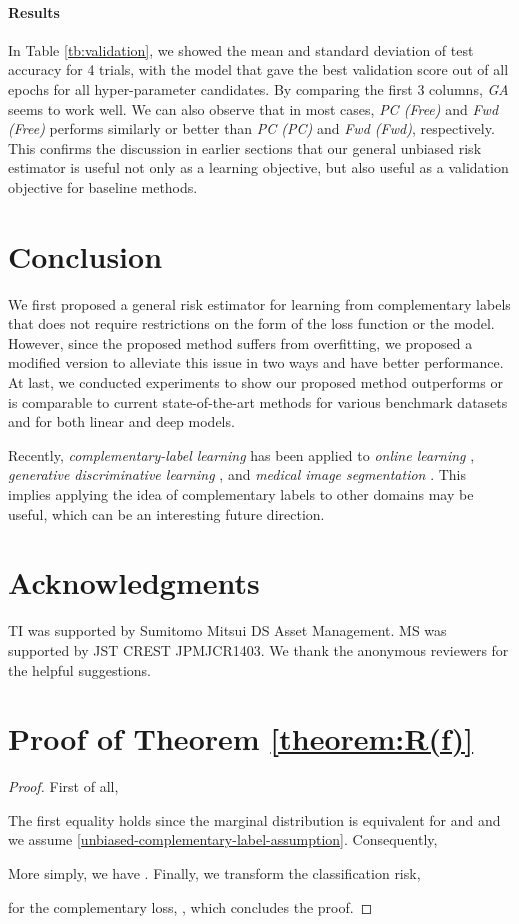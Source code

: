 \documentclass{article}
\begin{document}
\paragraph{Results}
In Table \ref{tb:validation}, we showed the mean and standard deviation of test accuracy for 4 trials, with the model that gave the best validation score out of all epochs for all hyper-parameter candidates.
By comparing the first 3 columns, \emph{GA} seems to work well.
We can also observe that in most cases, \emph{PC (Free)} and \emph{Fwd (Free)} performs similarly or better than \emph{PC (PC)} and \emph{Fwd (Fwd)}, respectively. This confirms the discussion in earlier sections that our general unbiased risk estimator is useful not only as a learning objective, but also useful as a validation objective for baseline methods.

\section{Conclusion}\label{sc:conclusion}
We first proposed a general risk estimator for learning from complementary labels that does not require restrictions on the form of the loss function or the model.
However, since the proposed method suffers from overfitting, we proposed a modified version to alleviate this issue in two ways and have better performance.
At last, we conducted experiments to show our proposed method outperforms or is comparable to current state-of-the-art methods for various benchmark datasets and for both linear and deep models.

Recently, \emph{complementary-label learning} has been applied to \emph{online learning} \citep{kaneko19arxiv}, \emph{generative discriminative learning} \citep{xu19arxiv}, and \emph{medical image segmentation} \citep{rezaei19mta}.  This implies applying the idea of complementary labels to other domains may be useful, which can be an interesting future direction.
\newpage
\section*{Acknowledgments}
TI was supported by Sumitomo Mitsui DS Asset Management. MS was supported by JST CREST JPMJCR1403.
We thank the anonymous reviewers for the helpful suggestions.




\clearpage
\appendix

\section{Proof of Theorem \ref{theorem:R(f)}}\label{sec:theorem1proof}
\begin{proof}
First of all,

The first equality holds since the marginal distribution is equivalent for  and  and we assume \eqref{unbiased-complementary-label-assumption}.
Consequently,

More simply, we have
.
Finally, we transform the classification risk,

for the complementary loss,
,
which concludes the proof.
\end{proof}
\end{document}
